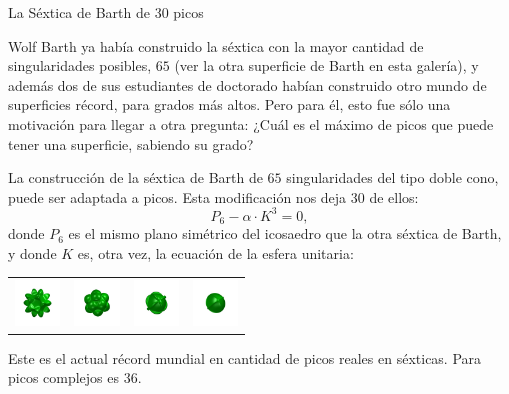 \documentclass[es]{../../common/SurferDesc}%
\begin{document}
\footnotesize



\begin{surferPage}
  \begin{surferTitle}La Séxtica de Barth de 30 picos\end{surferTitle}  

    Wolf Barth ya había construido la séxtica con la mayor cantidad de
    singularidades posibles, $65$ (ver la otra superficie de Barth
    en esta galería), y además dos de sus estudiantes de doctorado habían
    construido otro mundo de superficies récord, para grados más altos.
    Pero para él, esto fue sólo una motivación para llegar a otra pregunta:
    ¿Cuál es el máximo de picos que puede tener una superficie, sabiendo su grado?

   La construcción de la séxtica de Barth de $65$ singularidades del tipo doble cono,
   puede ser adaptada a picos. Esta modificación nos deja $30$ de ellos: 
    \[P_6 - \alpha \cdot K^3=0,\]
  donde $P_6$ es el mismo plano simétrico del icosaedro que la otra séxtica de Barth,
  y donde $K$ es, otra vez, la ecuación de la esfera unitaria:
    \vspace*{-0.4em}
    \begin{center}
      \begin{tabular}{c@{\ }c@{\ }c@{\ }c}
        \includegraphics[height=1.2cm]{../../common/images/barthsextic_30A2}
        &
        \includegraphics[height=1.2cm]{../../common/images/barthsextic_30A2_3}
        &
        \includegraphics[height=1.2cm]{../../common/images/barthsextic_30A2_5}
        &
        \includegraphics[height=1.2cm]{../../common/images/barthsextic_30A2_6}
      \end{tabular}
    \end{center}    
    \vspace*{-0.3em}
     Este es el actual récord mundial en cantidad de picos reales en séxticas.
     Para picos complejos es $36$. 



  \begin{surferText}
     \end{surferText}
\end{surferPage}
\end{document}
